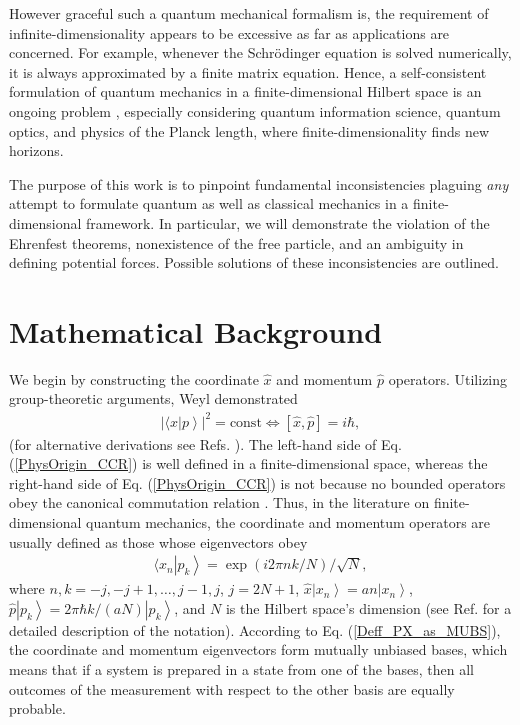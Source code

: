 \documentclass[twocolumn,pra,aps,showpacs,preprintnumbers,nofootinbib, superscriptaddress, amsmath,amssymb]{revtex4}
\newcommand*{\ket}[1]{\left| #1 \right\rangle}
\newcommand*{\commut}[1]{[ #1 ]}
\begin{document}
However graceful such a quantum mechanical formalism is, the requirement of infinite-dimensionality appears to be excessive as far as applications are concerned. For example, whenever the Schr\"{o}dinger equation is solved numerically, it is always approximated by a finite matrix equation. Hence, a self-consistent formulation of quantum mechanics in a finite-dimensional Hilbert space is an ongoing problem \cite{Weyl1950, Schwinger1960, Schwinger2003, Pearle1973, Santhanam1976, Jagannathan1981, Gudder1981, Jagannathan1982, Jagannathan1983, Gudder1985, Gudder1986, Busch1993, Galetti1999, Hakioglu2000, DelaTorre2003a, DelaTorre2003b, Vourdas2004, Gazeau2006, Revzen2008, Bang2009, Sasaki2011}, especially considering quantum information science, quantum optics, and  physics of the Planck length, where finite-dimensionality finds new horizons. 

The purpose of this work is to pinpoint fundamental inconsistencies plaguing {\it any} attempt to formulate quantum as well as classical mechanics in a finite-dimensional framework. In particular, we will demonstrate the violation of the Ehrenfest theorems, nonexistence of the free particle, and  an ambiguity in defining potential forces. Possible solutions of these inconsistencies are outlined.

\section{Mathematical Background} 

We begin by constructing the coordinate $\hat{x}$ and momentum $\hat{p}$ operators. Utilizing group-theoretic arguments, Weyl demonstrated \cite{Weyl1950} 
\begin{align}\label{PhysOrigin_CCR}
	\left| \langle x \ket{p} \right|^2 = \mbox{const} \Longleftrightarrow  \commut{ \hat{x}, \hat{p} } = i \hbar,
\end{align}
(for alternative derivations see Refs. \cite{Schwinger2003, Bondar2011a}). The left-hand side of Eq. (\ref{PhysOrigin_CCR}) is well defined  in a finite-dimensional space, whereas the right-hand side of Eq. (\ref{PhysOrigin_CCR}) is not because no bounded operators obey the canonical commutation relation \cite{Weyl1950, Reed1980}. Thus, in the literature on finite-dimensional quantum mechanics, the coordinate and momentum operators are usually defined as those whose eigenvectors obey
\begin{align}\label{Deff_PX_as_MUBS}
	\langle x_n \ket{p_k} = \exp(i2\pi n k /N) / \sqrt{N}, 
\end{align}
where $n,k = -j, -j+1, \ldots, j-1, j$, $j =2N+1$, $\hat{x} \ket{x_n} = an\ket{x_n}$, $\hat{p} \ket{p_k} = 2\pi \hbar k/(aN) \ket{p_k}$, and $N$ is the Hilbert space's dimension (see Ref. \cite{DelaTorre2003a} for a detailed description of the notation). According to Eq. (\ref{Deff_PX_as_MUBS}), the coordinate and momentum eigenvectors form mutually unbiased bases, which means that if a system is prepared in a state from one of the bases, then all outcomes of the measurement with respect to the other basis are equally probable.
\end{document}
